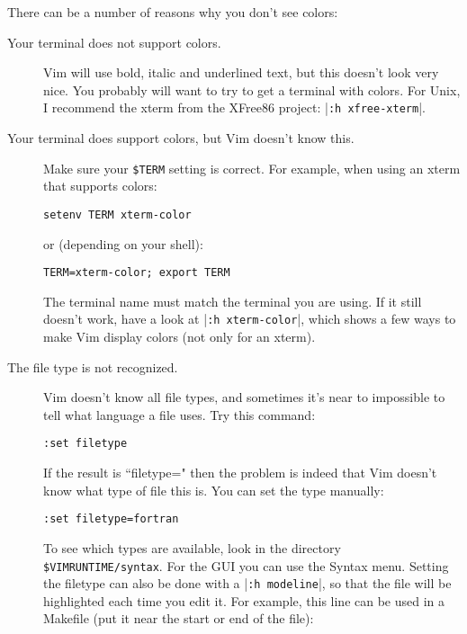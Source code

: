 There can be a number of reasons why you don't see colors:
\begin{description}
				\item [Your terminal does not support colors.]
								Vim will use bold, italic and underlined text, but this doesn't look very nice.
								You probably will want to try to get a terminal with colors.
								For Unix, I recommend the xterm from the XFree86 project: |\texttt{:h xfree-xterm}|.

				\item [Your terminal does support colors, but Vim doesn't know this.]
								Make sure your \texttt{\$TERM} setting is correct.  For example, when using an
								xterm that supports colors:

								\begin{Verbatim}[samepage=true]
		 setenv TERM xterm-color
								\end{Verbatim}

								or (depending on your shell):

								\begin{Verbatim}[samepage=true]
		 TERM=xterm-color; export TERM
								\end{Verbatim}

								The terminal name must match the terminal you are using.
								If it still doesn't work, have a look at |\texttt{:h xterm-color}|, which shows a few ways to make Vim display colors (not only for an xterm).

				\item [The file type is not recognized.]
								Vim doesn't know all file types, and sometimes it's near to impossible
								to tell what language a file uses.  Try this command:

								\begin{Verbatim}[samepage=true]
		 :set filetype
								\end{Verbatim}

								If the result is ``filetype=" then the problem is indeed that Vim doesn't know what type of file this is.
								You can set the type manually:

								\begin{Verbatim}[samepage=true]
		 :set filetype=fortran
												\end{Verbatim}

								To see which types are available, look in the directory \texttt{\$VIMRUNTIME/syntax}.
								For the GUI you can use the Syntax menu.
								Setting the filetype can also be done with a |\texttt{:h modeline}|, so that the file will be highlighted each time you edit it.
								For example, this line can be used in a Makefile (put it near the start or end of the file):


\end{description}

